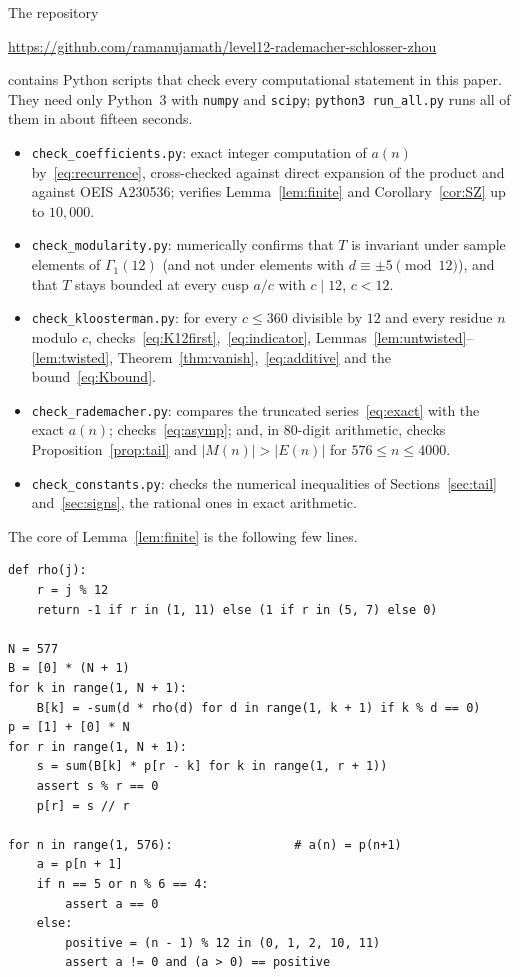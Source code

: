 \documentclass[11pt]{amsart}
\numberwithin{equation}{section}
\theoremstyle{definition}
\theoremstyle{remark}
\begin{document}
The repository
\begin{center}\url{https://github.com/ramanujamath/level12-rademacher-schlosser-zhou}\end{center}
contains Python scripts that check every computational statement in this paper. They need only Python~3 with \texttt{numpy} and \texttt{scipy}; \texttt{python3 run\_all.py} runs all of them in about fifteen seconds.
\begin{itemize}[leftmargin=*]
\item \texttt{check\_coefficients.py}: exact integer computation of $a(n)$ by~\eqref{eq:recurrence}, cross-checked against direct expansion of the product and against OEIS A230536; verifies Lemma~\ref{lem:finite} and Corollary~\ref{cor:SZ} up to $10{,}000$.
\item \texttt{check\_modularity.py}: numerically confirms that $T$ is invariant under sample elements of $\Gamma_1(12)$ (and not under elements with $d\equiv\pm5\pmod{12}$), and that $T$ stays bounded at every cusp $a/c$ with $c\mid12$, $c<12$.
\item \texttt{check\_kloosterman.py}: for every $c\le360$ divisible by $12$ and every residue $n$ modulo $c$, checks~\eqref{eq:K12first},~\eqref{eq:indicator}, Lemmas~\ref{lem:untwisted}--\ref{lem:twisted}, Theorem~\ref{thm:vanish},~\eqref{eq:additive} and the bound~\eqref{eq:Kbound}.
\item \texttt{check\_rademacher.py}: compares the truncated series~\eqref{eq:exact} with the exact $a(n)$; checks~\eqref{eq:asymp}; and, in $80$-digit arithmetic, checks Proposition~\ref{prop:tail} and $|M(n)|>|E(n)|$ for $576\le n\le4000$.
\item \texttt{check\_constants.py}: checks the numerical inequalities of Sections~\ref{sec:tail} and~\ref{sec:signs}, the rational ones in exact arithmetic.
\end{itemize}
The core of Lemma~\ref{lem:finite} is the following few lines.
\begin{verbatim}
def rho(j):
    r = j % 12
    return -1 if r in (1, 11) else (1 if r in (5, 7) else 0)

N = 577
B = [0] * (N + 1)
for k in range(1, N + 1):
    B[k] = -sum(d * rho(d) for d in range(1, k + 1) if k % d == 0)
p = [1] + [0] * N
for r in range(1, N + 1):
    s = sum(B[k] * p[r - k] for k in range(1, r + 1))
    assert s % r == 0
    p[r] = s // r

for n in range(1, 576):                 # a(n) = p(n+1)
    a = p[n + 1]
    if n == 5 or n % 6 == 4:
        assert a == 0
    else:
        positive = (n - 1) % 12 in (0, 1, 2, 10, 11)
        assert a != 0 and (a > 0) == positive
\end{verbatim}
\end{document}
